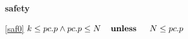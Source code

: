 \textbf{safety}
\begin{block}
\item[ \eqref{saf0} ]$k \le pc.p \land pc.p \le N \textbf{\quad unless \quad} N \le pc.p$ %
\end{block}
